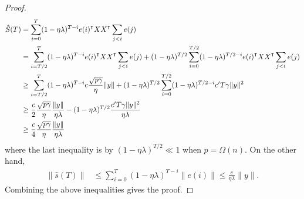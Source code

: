 \begin{proof}
\begin{equation*}
\begin{aligned}
    \hat{S}(T) &= \sum_{i=0}^T(1-\eta\lambda)^{T-i}e(i)\transpose XX\transpose \sum_{j<i}e(j) \\
    &= \sum_{i=T/2}^T(1-\eta\lambda)^{T-i}e(i)\transpose XX\transpose \sum_{j<i}e(j) + (1-\eta\lambda)^{T/2}\sum_{i=0}^{T/2}(1-\eta\lambda)^{T/2-i}e(i)\transpose XX\transpose \sum_{j<i}e(j) \\
    &\geq \sum_{i=T/2}^T(1-\eta\lambda)^{T-i}c\frac{\sqrt{p\gamma}}{\eta}\|y\| + (1-\eta\lambda)^{T/2}\sum_{i=0}^{T/2}(1-\eta\lambda)^{T/2-i}c'T\gamma\|y\|^2 \\
    &\geq \frac{c}{2}\frac{\sqrt{p\gamma}}{\eta}\frac{\|y\|}{\eta\lambda} -(1-\eta\lambda)^{T/2}\frac{c'T\gamma\|y\|^2}{\eta\lambda} \\
    &\geq \frac{c}{4}\frac{\sqrt{p\gamma}}{\eta}\frac{\|y\|}{\eta\lambda}
\end{aligned}
\end{equation*}
where the last inequality is by $(1-\eta\lambda)^{T/2}\ll 1$ when $p=\Omega(n)$. On the other hand,
\begin{equation*}
\begin{aligned}
\|\hat{s}(T)\|
&\leq \sum_{i=0}^T(1-\eta\lambda)^{T-i}\|e(i)\|\leq \frac{c}{\eta\lambda}\|y\|.
\end{aligned}
\end{equation*}
Combining the above inequalities gives the proof.
\end{proof}

